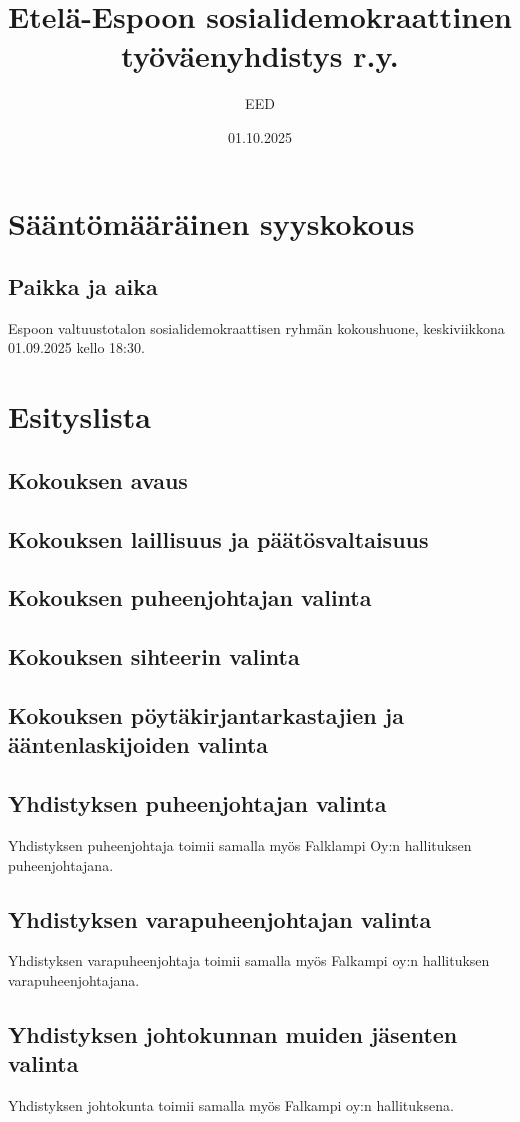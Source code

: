 \documentclass[a4paper,12pt]{article}
\title{Etelä-Espoon sosialidemokraattinen työväenyhdistys r.y.}
\author{EED}
\date{01.10.2025}
\begin{document}
\maketitle
\tableofcontents
\section*{Sääntömääräinen syyskokous}
\subsection*{Paikka ja aika}
Espoon valtuustotalon sosialidemokraattisen ryhmän kokoushuone, keskiviikkona 01.09.2025 kello 18:30.
\section*{Esityslista}
\subsection{Kokouksen avaus}
\subsection{Kokouksen laillisuus ja päätösvaltaisuus}
\subsection{Kokouksen puheenjohtajan valinta}
\subsection{Kokouksen sihteerin valinta}
\subsection{Kokouksen pöytäkirjantarkastajien ja ääntenlaskijoiden valinta}
\subsection{Yhdistyksen puheenjohtajan valinta}
Yhdistyksen puheenjohtaja toimii samalla myös Falklampi Oy:n hallituksen puheenjohtajana.
\subsection{Yhdistyksen varapuheenjohtajan valinta}
Yhdistyksen varapuheenjohtaja toimii samalla myös Falkampi oy:n hallituksen varapuheenjohtajana.
\subsection{Yhdistyksen johtokunnan muiden jäsenten valinta}
Yhdistyksen johtokunta toimii samalla myös Falkampi oy:n hallituksena.
\end{document}
